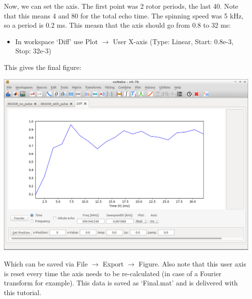 \documentclass[11pt,a4paper]{article}
\begin{document}
Now, we can set the axis. The first point was 2 rotor periods, the last 40. Note that this means 4
and 80 for the total echo time. The spinning speed was 5 kHz, so a period is 0.2 ms. This measn that
the axis should go from 0.8 to 32 ms:
\begin{itemize}
	\item In workspace `Diff' use Plot $\longrightarrow$ User X-axis (Type: Linear, Start: 0.8e-3,
	  Stop: 32e-3)
\end{itemize}
This gives the final figure:
\begin{center}
\includegraphics[width=0.8\linewidth]{Figs/Fig6.png}
\end{center}
Which can be saved via File $\longrightarrow$ Export $\longrightarrow$ Figure. Also note that this
user axis is reset every time the axis needs to be re-calculated (in case of a Fourier transform for
example). This data is saved as `Final.mat' and is delivered with this tutorial.
\end{document}
